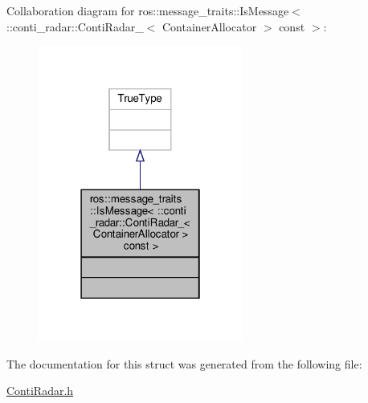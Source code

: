 Collaboration diagram for ros\+:\+:message\+\_\+traits\+:\+:Is\+Message$<$ \+:\+:conti\+\_\+radar\+:\+:Conti\+Radar\+\_\+$<$ Container\+Allocator $>$ const $>$\+:\nopagebreak
\begin{figure}[H]
\begin{center}
\leavevmode
\includegraphics[width=190pt]{d0/d23/structros_1_1message__traits_1_1IsMessage_3_01_1_1conti__radar_1_1ContiRadar___3_01ContainerAlloed4a943cdfedf34ccd140eb573e3a26e}
\end{center}
\end{figure}


The documentation for this struct was generated from the following file\+:\begin{DoxyCompactItemize}
\item 
\hyperlink{ContiRadar_8h}{Conti\+Radar.\+h}\end{DoxyCompactItemize}
